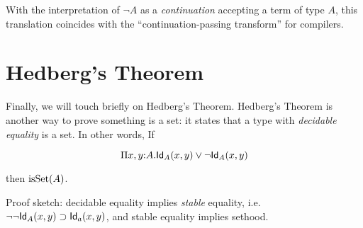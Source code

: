 \documentclass[11pt]{article}
\begin{document}
With the interpretation of $\lnot A$ as a {\em continuation} accepting a
term of type $A$, this translation coincides with the
``continuation-passing transform'' for compilers.


\section{Hedberg's Theorem}

Finally, we will touch briefly on Hedberg's Theorem.
Hedberg's Theorem is another way to prove something is a set: it states
that a type with {\em decidable equality} is a set. In other words, If

\[
\Pi{x,y}{:}A.\mathsf{Id}_{A}(x,y) \lor \lnot\mathsf{Id}_{A}(x,y)
\]

then $\operatorname{isSet}(A)$.

Proof sketch: decidable equality implies {\em stable} equality, i.e.
$\lnot\lnot\mathsf{Id}_{A}(x,y) \supset \mathsf{Id}_{a}(x,y)$, and stable equality implies
sethood.
\end{document}
